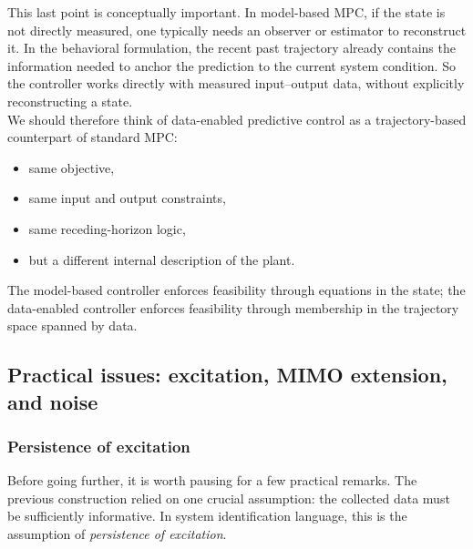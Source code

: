 This last point is conceptually important. In model-based MPC, if the state is not directly measured, one typically needs an observer or estimator to reconstruct it. In the behavioral formulation, the recent past trajectory already contains the information needed to anchor the prediction to the current system condition. So the controller works directly with measured input--output data, without explicitly reconstructing a state.\\
We should therefore think of data-enabled predictive control as a trajectory-based counterpart of standard MPC:
\begin{itemize}
    \item same objective,
    \item same input and output constraints,
    \item same receding-horizon logic,
    \item but a different internal description of the plant.
\end{itemize}
The model-based controller enforces feasibility through equations in the state; the data-enabled controller enforces feasibility through membership in the trajectory space spanned by data.\\
\subsection{Practical issues: excitation, MIMO extension, and noise}
\subsubsection{Persistence of excitation}
Before going further, it is worth pausing for a few practical remarks. The previous construction relied on one crucial assumption: the collected data must be sufficiently informative. In system identification language, this is the assumption of \emph{persistence of excitation}.\\

